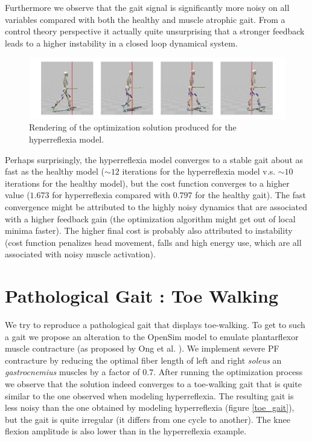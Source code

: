 \documentclass[11pt]{article}
\begin{document}
Furthermore we observe that the gait signal is significantly more noisy on all variables compared with both the healthy and muscle atrophic gait. From a control theory perspective it actually quite unsurprising that a stronger feedback leads to a higher instability in a closed loop dynamical system.

\begin{figure}[h!]
    \centering
    \includegraphics[width=\textwidth]{screens/toe_walk_hr.jpg}
    \caption{Rendering of the optimization solution produced for the hyperreflexia model.}
    \label{hr_render}
\end{figure}

Perhaps surprisingly, the hyperreflexia model converges to a stable gait about as fast as the healthy model ($\sim 12$ iterations for the hyperreflexia model v.s. $\sim 10$ iterations for the healthy model), but the cost function converges to a higher value ($1.673$ for hyperreflexia compared with $0.797$ for the healthy gait). The fast convergence might be attributed to the highly noisy dynamics that are associated with a higher feedback gain (the optimization algorithm might get out of local minima faster). The higher final cost is probably also attributed to instability (cost function penalizes head movement, falls and high energy use, which are all associated with noisy muscle activation).

\section{Pathological Gait : Toe Walking}

We try to reproduce a pathological gait that displays toe-walking. To get to such a gait we propose an alteration to the OpenSim model to emulate plantarflexor muscle contracture (as proposed by Ong et al. \cite{1}). We implement severe PF contracture by reducing the optimal fiber length of left and right \textit{soleus} an \textit{gastrocnemius} muscles by a factor of $0.7$. After running the optimization process we observe that the solution indeed converges to a toe-walking gait that is quite similar to the one observed when modeling hyperreflexia. The resulting gait is less noisy than the one obtained by modeling hyperreflexia (figure \ref{toe_gait}), but the gait is quite irregular (it differs from one cycle to another). The knee flexion amplitude is also lower than in the hyperreflexia example.
\end{document}
